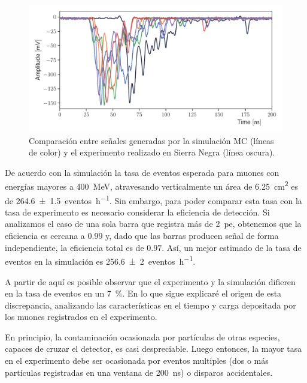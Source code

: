 \begin{figure}
        \centering
        \includegraphics[width=\textwidth]{muon-pulse.pdf}
        \caption{Comparación entre señales generadas por la simulación MC (líneas de color) y el experimento realizado en Sierra Negra (línea oscura).}
        \label{fig:muon-pulse}
\end{figure}

De acuerdo con la simulación la tasa de eventos esperada para muones con energías mayores a \SI{400}{\mega\electronvolt}, atravesando verticalmente un área de \SI{6.25}{\cm\squared} es de \SI{264.6(15)}{eventos\per\hour}. Sin embargo, para poder comparar esta tasa con la tasa de experimento es necesario considerar la eficiencia de detección. Si analizamos el caso de una sola barra que registra más de \SI{2}{pe}, obtenemos que la eficiencia es cercana a $0.99$ y, dado que las barras producen señal de forma independiente, la eficiencia total es de $0.97$. Así, un mejor estimado de la tasa de eventos en la simulación es \SI{256.6(20)}{eventos\per\hour}.

A partir de aquí es posible observar que el experimento y la simulación difieren en la tasa de eventos en un \SI{7}{\percent}. En lo que sigue explicaré el origen de esta discrepancia, analizando las características en el tiempo y carga depositada por los muones registrados en el experimento.

En principio, la contaminación ocasionada por partículas de otras especies, capaces de cruzar el detector, es casi despreciable. Luego entonces, la mayor tasa en el experimento debe ser ocasionada por eventos multiples (dos o más partículas registradas en una ventana de \SI{200}{\ns}) o disparos accidentales.

